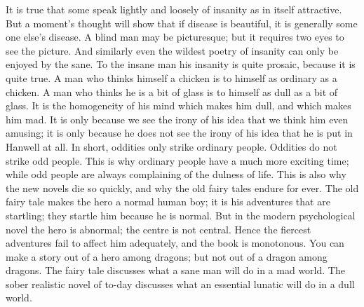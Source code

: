 \documentclass{book}
\begin{document}
It is true that some speak lightly and loosely of insanity as in itself attractive. But a moment’s thought will show that if disease is beautiful, it is generally some one else’s disease. A blind man may be picturesque; but it requires two eyes to see the picture. And similarly even the wildest poetry of insanity can only be enjoyed by the sane. To the insane man his insanity is quite prosaic, because it is quite true. A man who thinks himself a chicken is to himself as ordinary as a chicken. A man who thinks he is a bit of glass is to himself as dull as a bit of glass. It is the homogeneity of his mind which makes him dull, and which makes him mad. It is only because we see the irony of his idea that we think him even amusing; it is only because he does not see the irony of his idea that he is put in Hanwell at all. In short, oddities only strike ordinary people. Oddities do not strike odd people. This is why ordinary people have a much more exciting time; while odd people are always complaining of the dulness of life. This is also why the new novels die so quickly, and why the old fairy tales endure for ever. The old fairy tale makes the hero a normal human boy; it is his adventures that are startling; they startle him because he is normal. But in the modern psychological novel the hero is abnormal; the centre is not central. Hence the fiercest adventures fail to affect him adequately, and the book is monotonous. You can make a story out of a hero among dragons; but not out of a dragon among dragons. The fairy tale discusses what a sane man will do in a mad world. The sober realistic novel of to-day discusses what an essential lunatic will do in a dull world.
\end{document}
